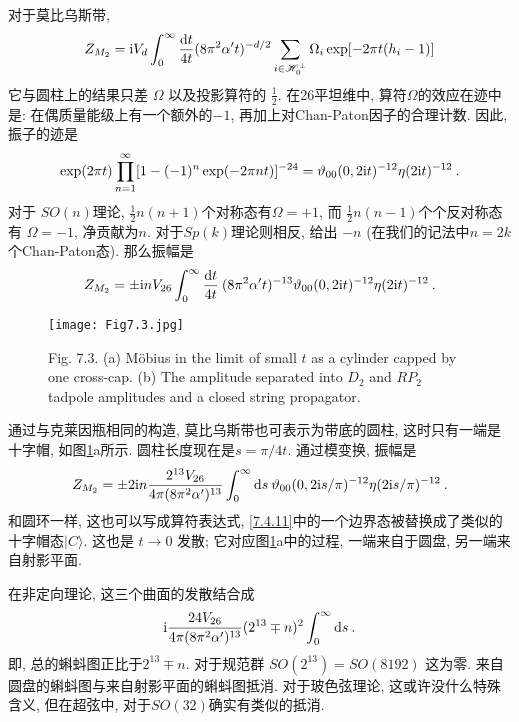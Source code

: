 对于莫比乌斯带,
\begin{equation}
	Z_{M_{2}}=\mathrm{i} V_{d} \int_{0}^{\infty} \frac{\mathrm{d} t}{4 t} (8 \pi^{2} \alpha^{\prime} t)^{-d / 2} 
	\sum_{i \in \mathscr{H}_{0}^{\perp}} \Omega_{i} \exp [-2 \pi t(h_{i}-1)] \label{7.4.20}
\end{equation}
它与圆柱上的结果只差 $\Omega$ 以及投影算符的 $\frac{1}{2}$. 在26平坦维中, 算符$\Omega$的效应在迹中是: 在偶质量能级上有一个额外的$-1$, 
再加上对Chan-Paton因子的合理计数. 因此, 振子的迹是
\begin{equation}
	\exp (2 \pi t) \prod_{n=1}^{\infty}[1-(-1)^{n} \exp (-2 \pi n t)]^{-24}=\vartheta_{00}(0,2 \mathrm{i} t)^{-12} \eta(2 \mathrm{i} t)^{-12} \:. \label{7.4.21}
\end{equation}
对于 $S O(n)$理论,  $\frac{1}{2} n(n+1)$个对称态有$\Omega=+1$, 而 $\frac{1}{2} n(n-1)$个个反对称态有 $\Omega=-1$, 净贡献为$n$. 
对于$S p(k)$理论则相反, 给出 $-n$ (在我们的记法中$n=2 k$个Chan-Paton态). 那么振幅是
\begin{equation}
	Z_{M_{2}}=\pm \mathrm{i} n V_{26} \int_{0}^{\infty} \frac{\mathrm{d} t}{4 t} \: (8 \pi^{2} \alpha^{\prime} t)^{-13} 
	\vartheta_{00}(0,2 \mathrm{i} t)^{-12} \eta(2 \mathrm{i} t)^{-12} \:. \label{7.4.22}
\end{equation}
 

\begin{figure}[h]
	\begin{center}
		\texttt{[image: Fig7.3.jpg]}\\
		\caption{Fig. 7.3. (a) Möbius in the limit of small $t$ as a cylinder capped by one cross-cap. (b) The amplitude separated into $D_{2}$ and $R P_{2}$ tadpole amplitudes and a closed string propagator.}\label{Fig7.3}
	\end{center}
\end{figure}


通过与克莱因瓶相同的构造,  莫比乌斯带也可表示为带底的圆柱, 这时只有一端是十字帽, 如图\ref{Fig7.3}a所示. 
圆柱长度现在是$s=\pi / 4 t$. 通过模变换, 振幅是
\begin{equation}
Z_{M_{2}}=\pm 2 \mathrm{i} n \frac{2^{13} V_{26}}{4 \pi(8 \pi^{2} \alpha^{\prime})^{13}}
 \int_{0}^{\infty} \mathrm{d} s \: \vartheta_{00}(0,2 \mathrm{i} s / \pi)^{-12} \eta(2 \mathrm{i} s / \pi)^{-12} \:. \label{7.4.23}
\end{equation}
和圆环一样, 这也可以写成算符表达式, \eqref{7.4.11}中的一个边界态被替换成了类似的十字帽态$|C\rangle $. 
这也是 $t \rightarrow 0$ 发散; 它对应图\ref{Fig7.3}a中的过程, 一端来自于圆盘, 另一端来自射影平面. 

在非定向理论, 这三个曲面的发散结合成
\begin{equation}
	\mathrm{i} \frac{24 V_{26}}{4 \pi(8 \pi^{2} \alpha^{\prime})^{13}}(2^{13} \mp n)^{2} \int_{0}^{\infty} \mathrm{d} s\:. \label{7.4.24}
\end{equation}
即, 总的蝌蚪图正比于$2^{13} \mp n $. 对于规范群 $SO(2^{13})=S O(8192)$ 这为零. 来自圆盘的蝌蚪图与来自射影平面的蝌蚪图抵消. 
对于玻色弦理论, 这或许没什么特殊含义, 但在超弦中, 对于$SO(32)$确实有类似的抵消.
